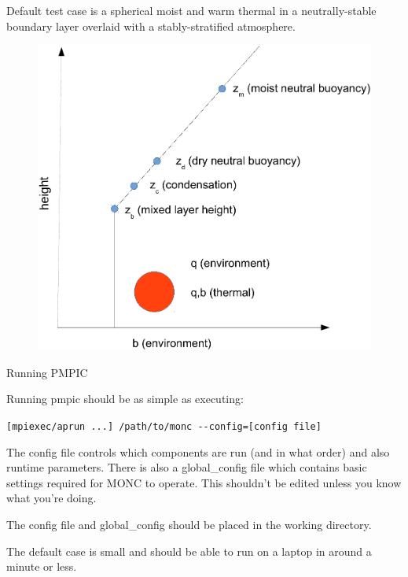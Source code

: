 \documentclass{beamer}
\begin{document}
\begin{frame}
Default test case is a spherical moist and
warm thermal in a neutrally-stable boundary layer overlaid with a
stably-stratified atmosphere. 

\begin{figure}
  \begin{center}
    \includegraphics[scale=0.45]{pmpic_images/profile_init.pdf}
  \end{center}
\end{figure}

\end{frame}

\begin{frame}[fragile]{Running PMPIC}
\protect\hypertarget{running-pmpic}{}

Running pmpic should be as simple as executing:

\texttt{{[}mpiexec/aprun\ ...{]}\ /path/to/monc\ -\/-config={[}config\ file{]}}

The config file controls which components are run (and in what order)
and also runtime parameters. There is also a global\_config file which
contains basic settings required for MONC to operate. This shouldn't be
edited unless you know what you're doing.

The config file and global\_config should be placed in the working
directory.

The default case is small and should be able to run on a laptop in around a minute or less.

\end{frame}
\end{document}
